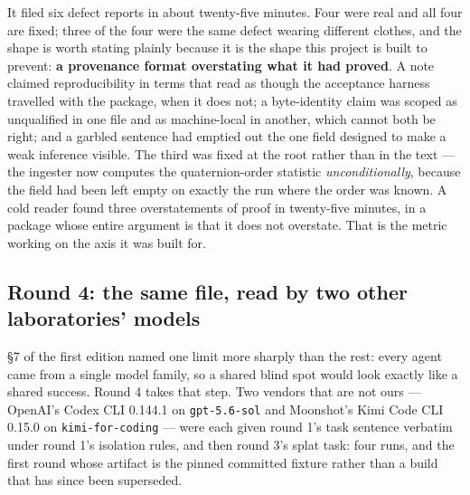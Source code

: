 \documentclass[10pt,twocolumn,letterpaper]{article}
\newcommand{\code}[1]{\texttt{\small #1}}
\begin{document}
It filed six defect reports in about twenty-five minutes. Four were real and all four are fixed; three of the four were the same defect wearing different clothes, and the shape is worth stating plainly because it is the shape this project is built to prevent: \textbf{a provenance format overstating what it had proved}. A note claimed reproducibility in terms that read as though the acceptance harness travelled with the package, when it does not; a byte-identity claim was scoped as unqualified in one file and as machine-local in another, which cannot both be right; and a garbled sentence had emptied out the one field designed to make a weak inference visible. The third was fixed at the root rather than in the text --- the ingester now computes the quaternion-order statistic \emph{unconditionally}, because the field had been left empty on exactly the run where the order was known. A cold reader found three overstatements of proof in twenty-five minutes, in a package whose entire argument is that it does not overstate. That is the metric working on the axis it was built for.

\subsection{Round 4: the same file, read by two other laboratories' models}

\S7 of the first edition named one limit more sharply than the rest: every agent came from a single model family, so a shared blind spot would look exactly like a shared success. Round 4 takes that step. Two vendors that are not ours --- OpenAI's Codex CLI 0.144.1 on \code{gpt-5.6-sol} and Moonshot's Kimi Code CLI 0.15.0 on \code{kimi-for-coding} --- were each given round 1's task sentence verbatim under round 1's isolation rules, and then round 3's splat task: four runs, and the first round whose artifact is the pinned committed fixture rather than a build that has since been superseded.
\end{document}
